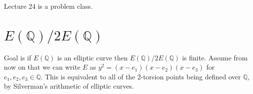 \documentclass{article}
\newcommand{\Q}{\mathbb{Q}}
\newcommand{\rb}[1]{\left( #1 \right)}
\theoremstyle{definition}\newtheorem{definition}{Definition}[section]
\theoremstyle{definition}\newtheorem{remark}[definition]{Remark}
\theoremstyle{definition}\newtheorem*{example}{Example}
\theoremstyle{definition}\newtheorem*{note}{Note}
\begin{document}

Lecture 24 is a problem class.


\section{$ E\rb{\Q} / 2E\rb{\Q} $}

Goal is if $ E\rb{\Q} $ is an elliptic curve then $ E\rb{\Q} / 2E\rb{\Q} $ is finite. Assume from now on that we can write $ E $ as $ y^2 = \rb{x - e_1}\rb{x - e_2}\rb{x - e_3} $ for $ e_1, e_2, e_3 \in \Q $. This is equivalent to all of the $ 2 $-torsion points being defined over $ \Q $, by Silverman's arithmetic of elliptic curves.
\end{document}
